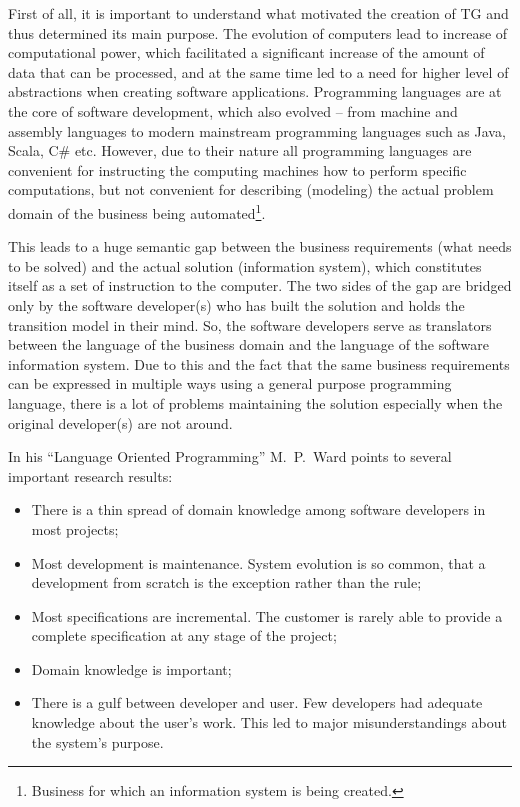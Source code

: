   First of all, it is important to understand what motivated the creation of TG and thus determined its main purpose.
  The evolution of computers lead to increase of computational power, which facilitated a significant increase of the amount of data that can be processed, and at the same time led to a need for higher level of abstractions when creating software applications.
  Programming languages are at the core of software development, which also evolved -- from machine and assembly languages to modern mainstream programming languages such as Java, Scala, C\# etc.
  However, due to their nature all programming languages are convenient for instructing the computing machines how to perform specific computations, but not convenient for describing (modeling) the actual problem domain of the business being automated\footnote{Business for which an information system is being created.}.
  
  This leads to a huge semantic gap between the business requirements (what needs to be solved) and the actual solution (information system), which constitutes itself as a set of instruction to the computer.
  The two sides of the gap are bridged only by the software developer(s) who has built the solution and holds the transition model in their mind.
  So, the software developers serve as translators between the language of the business domain and the language of the software information system.
  Due to this and the fact that the same business requirements can be expressed in multiple ways using a general purpose programming language, there is a lot of problems maintaining the solution especially when the original developer(s) are not around.

  In his ``Language Oriented Programming'' M.~P.~Ward points to several important research results:
  \begin{itemize}
    \item There is a thin spread of domain knowledge among software developers in most projects;    
    \item Most development is maintenance. 
	  System evolution is so common, that a development from scratch is the exception rather than the rule;
    \item Most specifications are incremental. 
	  The customer is rarely able to provide a complete specification at any stage of the project;
    \item Domain knowledge is important;
    \item There is a gulf between developer and user. 
	  Few developers had adequate knowledge about the user's work. 
	  This led to major misunderstandings about the system's purpose.
  \end{itemize}
  
